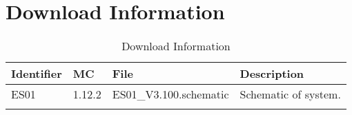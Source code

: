 \documentclass[10pt]{datasheet}
\begin{document}
\section{Download Information}
\begin{table}[h]
    \caption{Download Information}
    \begin{tabularx}{\textwidth}{l | l | l | X}
        \thickhline
        \textbf{Identifier} & \textbf{MC} & \textbf{File} & \textbf{Description} \\
        \hline
        ES01 & 1.12.2 & ES01\_V3.100.schematic & Schematic of system. \\
        \hline
        \thickhline
    \end{tabularx}
\end{table}
\end{document}
